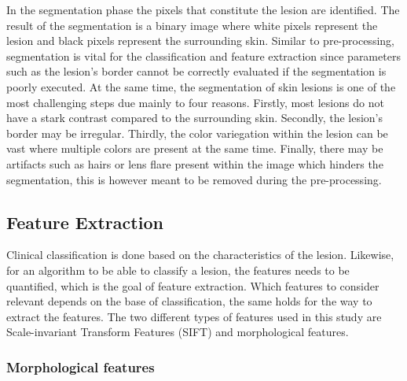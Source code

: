 \documentclass{kththesis}
\begin{document}
In the segmentation phase the pixels that constitute the lesion are identified. The result of the segmentation is a binary image where white pixels represent the lesion and black pixels represent the surrounding skin. Similar to pre-processing, segmentation is vital for the classification and feature extraction since parameters such as the lesion’s border cannot be correctly evaluated if the segmentation is poorly executed. At the same time, the segmentation of skin lesions is one of the most challenging steps due mainly to four reasons. Firstly, most lesions do not have a stark contrast compared to the surrounding skin. Secondly, the lesion’s border may be irregular. Thirdly, the color variegation %
within the lesion can be vast where multiple colors are present at the same time. Finally, there may be artifacts such as hairs or lens flare present within the image which hinders the segmentation, this is however meant to be removed during the pre-processing. \parencite{jaworek2016automatic}


\subsection{Feature Extraction}

Clinical classification is done based on the characteristics of the lesion. Likewise, for an algorithm to be able to classify a lesion, the features needs to be quantified, which is the goal of feature extraction. Which features to consider relevant depends on the base of classification, the same holds for the way to extract the features. The two different types of features used in this study are Scale-invariant Transform Features (SIFT) and morphological features.

\subsubsection{Morphological features}
\end{document}
